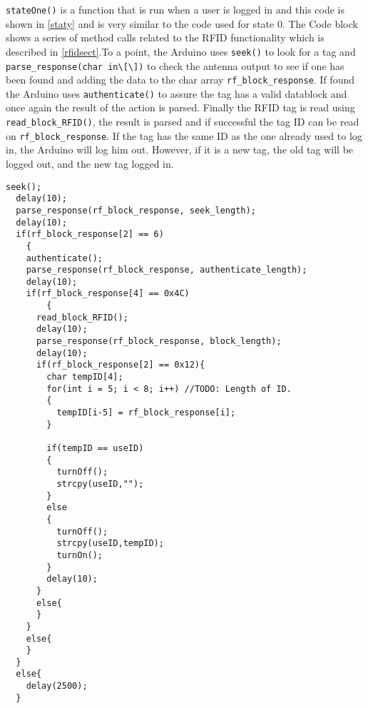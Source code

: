 \verb|stateOne()| is a function that is run when a user is logged in and this code is shown in \autoref{staty} and is very similar to the code used for state 0.
The Code block shows a series of method calls related to the RFID functionality which is described in \autoref{rfidsect}.\newline To a point, the Arduino uses \verb|seek()| to look for a tag and \verb|parse_response(char in\[\])| to check the antenna output to see if one has been found and adding the data to the char array \verb|rf_block_response|. 
If found the Arduino uses \verb|authenticate()| to assure the tag has a valid datablock and once again the result of the action is parsed. Finally the RFID tag is read using \verb|read_block_RFID()|, the result is parsed and if successful the tag ID can be read on \verb|rf_block_response|.\newline
If the tag has the same ID as the one already used to log in, the Arduino will log him out. However, if it is a new tag, the old tag will be logged out, and the new tag logged in.
\begin{lstlisting}[frame=single, label=staty, caption=The Arduino state one code.]
  seek();
  delay(10);
  parse_response(rf_block_response, seek_length);
  delay(10);
  if(rf_block_response[2] == 6)
	{
    authenticate();
    parse_response(rf_block_response, authenticate_length);
    delay(10);
    if(rf_block_response[4] == 0x4C)
		{
      read_block_RFID();
      delay(10);
      parse_response(rf_block_response, block_length);
      delay(10);
      if(rf_block_response[2] == 0x12){
        char tempID[4];
        for(int i = 5; i < 8; i++) //TODO: Length of ID.
        {        
          tempID[i-5] = rf_block_response[i];
        } 
        
        if(tempID == useID)
        {
          turnOff();
          strcpy(useID,"");
        }
        else
        {
          turnOff();
          strcpy(useID,tempID);
          turnOn();
        }
        delay(10);
      }
      else{
      }
    }
    else{
    }
  }
  else{ 
    delay(2500);
  }
\end{lstlisting}
